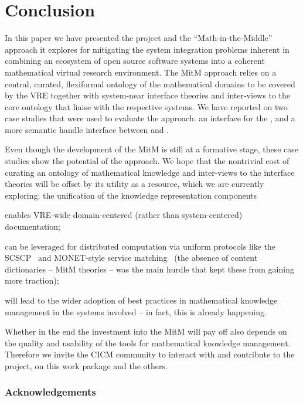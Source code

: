 \section{Conclusion}\label{sec:concl}
In this paper we have presented the \ODK project and the ``Math-in-the-Middle'' approach
it explores for mitigating the system integration problems inherent in combining an ecosystem
of open source software systems into a coherent mathematical virtual research environment.
The MitM approach relies on a central, curated, flexiformal ontology of the mathematical
domains to be covered by the VRE together with system-near interface theories and
inter-views to the core ontology that liaise with the respective systems. We have reported
on two case studies that were used to evaluate the approach: an interface for the \LMFDB,
and a more semantic handle interface between \GAP and \Sage.

Even though the development of the MitM is still at a formative stage, these case studies
show the potential of the approach. We hope that the nontrivial cost of curating an
ontology of mathematical knowledge and inter-views to the interface theories will be offset
by its utility as a resource, which we are currently exploring; the unification of the
knowledge representation components
\begin{compactitem}
\item enables VRE-wide domain-centered (rather than system-centered) documentation;
\item can be leveraged for distributed computation via uniform protocols like the
  SCSCP~\cite{HorRoz:ossp09} and MONET-style service
  matching~\cite{CaprottiEtAl:MathServiceMatching04:tr} (the absence of content
  dictionaries -- MitM theories -- was the main hurdle that kept these from gaining more
  traction);
\item will lead to the wider adoption of best practices in
  mathematical knowledge management in the systems involved -- in
  fact, this is already happening.
\end{compactitem}
Whether in the end the investment into the MitM will pay off also depends on the quality
and usability of the tools for mathematical knowledge management. Therefore we invite the
CICM community to interact with and contribute to the \ODK project, on
this work package and the others.

\subsubsection*{Acknowledgements}

